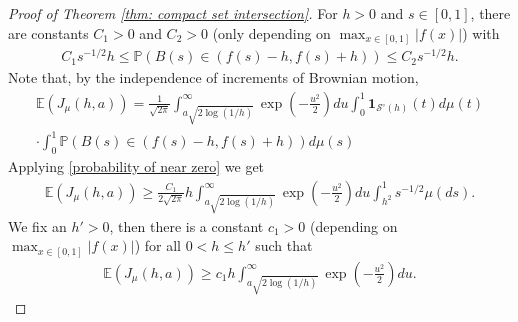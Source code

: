 \documentclass[11pt, reqno]{amsart}
\theoremstyle{plain}
\theoremstyle{definition}
\theoremstyle{remark}
\begin{document}
\begin{proof}[Proof of Theorem \ref{thm: compact set intersection}]
For $h>0$ and $s\in[0,1]$, there are constants $C_1 >0$ and $C_2 >0$ (only depending on $\max_{x\in[0,1]} |f(x)|$) with
\begin{align}\label{probability of near zero}
 C_1 s^{-1/2}h \leq {\mathbb{P}}(B(s) \in (f(s)-h, f(s)+h)) \leq C_2 s^{-1/2}h.
\end{align}
Note that, by the independence of increments of Brownian motion,
\begin{multline*}
 {\mathbb{E}} (J_{\mu}(h,a)) = \frac{1}{\sqrt{2\pi}}\int_{a\sqrt{2\log(1/h)}}^\infty \exp(-\frac{u^2}{2}) du \int_0^1 {\mathbf{1}}_{  {\mathcal{S}}^\circ(h) }(t)d\mu (t)
\\ \cdot
 \int_0^1 {\mathbb{P}}(B(s) \in (f(s)-h, f(s)+h)) d\mu(s)
\end{multline*}
Applying \ref{probability of near zero} we get
\begin{align*}
 {\mathbb{E}} (J_{\mu}(h,a))  \geq \frac{C_1}{2\sqrt{2\pi}} h \int_{a\sqrt{2\log(1/h)}}^\infty \exp(-\frac{u^2}{2}) du \int_{h^2}^1 s^{-1/2}\mu(ds).
\end{align*}
We fix an $h'>0$, then there is a constant $c_1>0$ (depending on $\max_{x\in[0,1]} |f(x)|$) for all $0<h\leq h'$ such that
\begin{align}\label{firstmoment_fasttime}
 {\mathbb{E}} (J_{\mu}(h,a))  \geq c_1 h \int_{a\sqrt{2\log(1/h)}}^\infty \exp(-\frac{u^2}{2}) du.
\end{align}


\end{proof}
\end{document}
